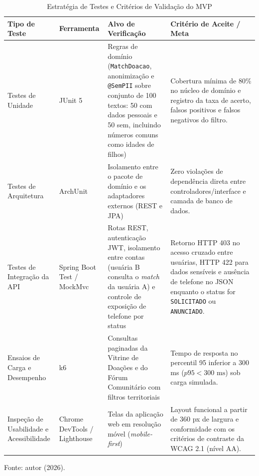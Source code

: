 \begin{table}[H]
\centering
\singlespacing
\caption{Estratégia de Testes e Critérios de Validação do MVP}
\label{tab:testes}
\small
\begin{tabular}{p{3.0cm}p{2.9cm}p{4.0cm}p{4.4cm}}
\toprule
\textbf{Tipo de Teste} & \textbf{Ferramenta} & \textbf{Alvo de Verificação} & \textbf{Critério de Aceite / Meta} \\
\midrule
Testes de Unidade & JUnit 5 & Regras de domínio (\texttt{MatchDoacao}, anonimização e \texttt{@SemPII} sobre conjunto de 100 textos: 50 com dados pessoais e 50 sem, incluindo números comuns como idades de filhos) & Cobertura mínima de 80\% no núcleo de domínio e registro da taxa de acerto, falsos positivos e falsos negativos do filtro. \\
\addlinespace
Testes de Arquitetura & ArchUnit & Isolamento entre o pacote de domínio e os adaptadores externos (REST e JPA) & Zero violações de dependência direta entre controladores/interface e camada de banco de dados. \\
\addlinespace
Testes de Integração da API & Spring Boot Test / MockMvc & Rotas REST, autenticação JWT, isolamento entre contas (usuária B consulta o \textit{match} da usuária A) e controle de exposição de telefone por status & Retorno HTTP 403 no acesso cruzado entre usuárias, HTTP 422 para dados sensíveis e ausência de telefone no JSON enquanto o status for \texttt{SOLICITADO} ou \texttt{ANUNCIADO}. \\
\addlinespace
Ensaios de Carga e Desempenho & k6 & Consultas paginadas da Vitrine de Doações e do Fórum Comunitário com filtros territoriais & Tempo de resposta no percentil 95 inferior a 300 ms ($p95 < 300\text{ ms}$) sob carga simulada. \\
\addlinespace
Inspeção de Usabilidade e Acessibilidade & Chrome DevTools / Lighthouse & Telas da aplicação web em resolução móvel (\textit{mobile-first}) & Layout funcional a partir de 360 px de largura e conformidade com os critérios de contraste da WCAG 2.1 (nível AA). \\
\bottomrule
\end{tabular}
\vspace{0.15cm}

{\small Fonte: autor (2026).}
\end{table}